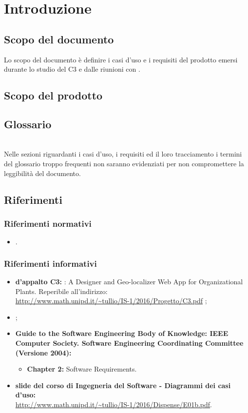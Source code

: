 \section{Introduzione}
	\subsection {Scopo del documento}
	Lo scopo del documento è definire i casi d'uso e i requisiti del prodotto emersi durante lo studio del  C3 e dalle riunioni con \riskapp.
	\subsection {Scopo del prodotto}
	\introScopo
	\subsection {Glossario}
	\introGlossario\\
    Nelle sezioni riguardanti i casi d'uso, i requisiti ed il loro tracciamento i termini del glossario troppo frequenti non saranno evidenziati per non compromettere la leggibilità del documento.
	\subsection {Riferimenti}
		\subsubsection{Riferimenti normativi}
			\begin{itemize}
				\item \ndpv.
			\end{itemize}
		\subsubsection{Riferimenti informativi}
			\begin{itemize}
				\item \textbf{ d'appalto C3:} \progetto: A Designer and Geo-localizer Web App for Organizational Plants. Reperibile all'indirizzo:\\ \url{http://www.math.unipd.it/~tullio/IS-1/2016/Progetto/C3.pdf} ;
				\item \sdfv;
				\item \textbf{Guide to the Software Engineering Body of Knowledge: IEEE Computer Society. Software Engineering Coordinating Committee (Versione 2004):}
				\begin{itemize}
					\item \textbf{Chapter 2:} Software Requirements.
				\end{itemize}
				\item \textbf{slide del corso di Ingegneria del Software - Diagrammi dei casi d'uso:}\\
				\url{http://www.math.unipd.it/~tullio/IS-1/2016/Dispense/E01b.pdf}.
			\end{itemize}
